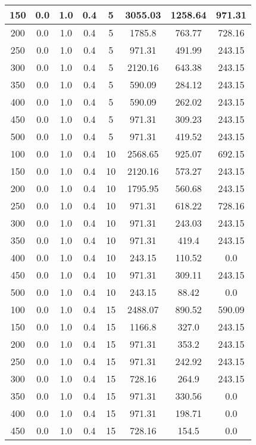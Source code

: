 \documentclass[a4paper, 12pt]{extreport}
\begin{document}
\begin{itemize}
\begin{longtable}{|c|c|c|c|c|c|c|c|}
			150 & 0.0 & 1.0 & 0.4 & 5 & 3055.03 & 1258.64 & 971.31 \\\hline
			200 & 0.0 & 1.0 & 0.4 & 5 & 1785.8 & 763.77 & 728.16 \\\hline
			250 & 0.0 & 1.0 & 0.4 & 5 & 971.31 & 491.99 & 243.15 \\\hline
			300 & 0.0 & 1.0 & 0.4 & 5 & 2120.16 & 643.38 & 243.15 \\\hline
			350 & 0.0 & 1.0 & 0.4 & 5 & 590.09 & 284.12 & 243.15 \\\hline
			400 & 0.0 & 1.0 & 0.4 & 5 & 590.09 & 262.02 & 243.15 \\\hline
			450 & 0.0 & 1.0 & 0.4 & 5 & 971.31 & 309.23 & 243.15 \\\hline
			500 & 0.0 & 1.0 & 0.4 & 5 & 971.31 & 419.52 & 243.15 \\\hline
			100 & 0.0 & 1.0 & 0.4 & 10 & 2568.65 & 925.07 & 692.15 \\\hline
			150 & 0.0 & 1.0 & 0.4 & 10 & 2120.16 & 573.27 & 243.15 \\\hline
			200 & 0.0 & 1.0 & 0.4 & 10 & 1795.95 & 560.68 & 243.15 \\\hline
			250 & 0.0 & 1.0 & 0.4 & 10 & 971.31 & 618.22 & 728.16 \\\hline
			300 & 0.0 & 1.0 & 0.4 & 10 & 971.31 & 243.03 & 243.15 \\\hline
			350 & 0.0 & 1.0 & 0.4 & 10 & 971.31 & 419.4 & 243.15 \\\hline
			400 & 0.0 & 1.0 & 0.4 & 10 & 243.15 & 110.52 & 0.0 \\\hline
			450 & 0.0 & 1.0 & 0.4 & 10 & 971.31 & 309.11 & 243.15 \\\hline
			500 & 0.0 & 1.0 & 0.4 & 10 & 243.15 & 88.42 & 0.0 \\\hline
			100 & 0.0 & 1.0 & 0.4 & 15 & 2488.07 & 890.52 & 590.09 \\\hline
			150 & 0.0 & 1.0 & 0.4 & 15 & 1166.8 & 327.0 & 243.15 \\\hline
			200 & 0.0 & 1.0 & 0.4 & 15 & 971.31 & 353.2 & 243.15 \\\hline
			250 & 0.0 & 1.0 & 0.4 & 15 & 971.31 & 242.92 & 243.15 \\\hline
			300 & 0.0 & 1.0 & 0.4 & 15 & 728.16 & 264.9 & 243.15 \\\hline
			350 & 0.0 & 1.0 & 0.4 & 15 & 971.31 & 330.56 & 0.0 \\\hline
			400 & 0.0 & 1.0 & 0.4 & 15 & 971.31 & 198.71 & 0.0 \\\hline
			450 & 0.0 & 1.0 & 0.4 & 15 & 728.16 & 154.5 & 0.0 \\\hline

\end{longtable}
\end{itemize}
\end{document}
